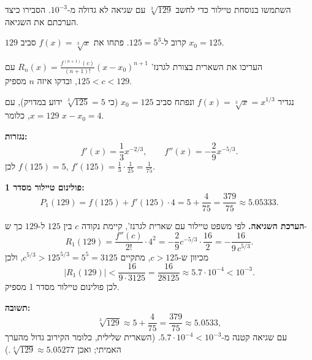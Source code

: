 
\begin{question}
השתמשו בנוסחת טיילור כדי לחשב $\sqrt[3]{129}$ עם שגיאה לא גדולה מ-$10^{-3}$.
הסבירו כיצד הערכתם את השגיאה.
\end{question}

\begin{hint}
$129$ קרוב ל-$125=5^3$. פתחו את $f(x)=\sqrt[3]{x}$ סביב $x_0=125$.
\end{hint}

\begin{hint}
העריכו את השארית בצורת לגרנז' $R_n(x)=\frac{f^{(n+1)}(c)}{(n+1)!}(x-x_0)^{n+1}$ עם $125<c<129$, ובדקו איזה $n$ מספיק.
\end{hint}

\begin{solution}
נגדיר $f(x)=\sqrt[3]{x}=x^{1/3}$ ונפתח סביב $x_0=125$ (כי $\sqrt[3]{125}=5$ ידוע במדויק), עם $x=129$, כלומר $x-x_0=4$.

\textbf{נגזרות:}
\[
f'(x)=\frac13 x^{-2/3},\qquad f''(x)=-\frac29 x^{-5/3}.
\]
לכן $f(125)=5$, $f'(125)=\frac13\cdot\frac{1}{25}=\frac{1}{75}$.

\textbf{פולינום טיילור מסדר 1:}
\[
P_1(129)=f(125)+f'(125)\cdot 4=5+\frac{4}{75}=\frac{379}{75}\approx 5.05333.
\]

\textbf{הערכת השגיאה.} לפי משפט טיילור עם שארית לגרנז', קיימת נקודה $c$ בין $125$ ל-$129$ כך ש-
\[
R_1(129)=\frac{f''(c)}{2!}\cdot 4^2=-\frac{2}{9}c^{-5/3}\cdot\frac{16}{2}=-\frac{16}{9\,c^{5/3}}.
\]
מכיוון ש-$c>125$, מתקיים $c^{5/3}>125^{5/3}=5^5=3125$, ולכן
\[
|R_1(129)|<\frac{16}{9\cdot 3125}=\frac{16}{28125}\approx 5.7\cdot 10^{-4}<10^{-3}.
\]
לכן פולינום טיילור מסדר 1 מספיק.

\textbf{תשובה:}
\[
\sqrt[3]{129}\approx 5+\frac{4}{75}=\frac{379}{75}\approx 5.0533,
\]
עם שגיאה קטנה מ-$5.7\cdot10^{-4}<10^{-3}$. (השארית שלילית, כלומר הקירוב גדול מהערך האמיתי; ואכן $\sqrt[3]{129}\approx 5.05277$.)
\end{solution}

